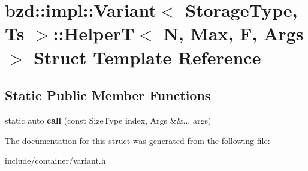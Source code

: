 \hypertarget{structbzd_1_1impl_1_1Variant_1_1HelperT}{}\section{bzd\+:\+:impl\+:\+:Variant$<$ Storage\+Type, Ts $>$\+:\+:HelperT$<$ N, Max, F, Args $>$ Struct Template Reference}
\label{structbzd_1_1impl_1_1Variant_1_1HelperT}
\subsection*{Static Public Member Functions}
\begin{DoxyCompactItemize}
\item 
\mbox{\label{structbzd_1_1impl_1_1Variant_1_1HelperT_ac44d6a6bfede4b5cd0cef49ada7999b6}} 
static auto {\bfseries call} (const Size\+Type index, Args \&\&... args)
\end{DoxyCompactItemize}


The documentation for this struct was generated from the following file\+:\begin{DoxyCompactItemize}
\item 
include/container/variant.\+h\end{DoxyCompactItemize}
